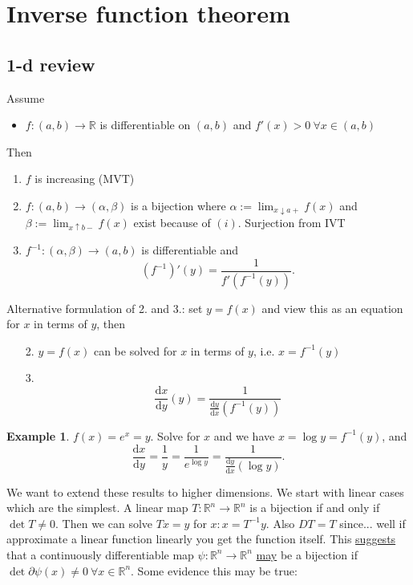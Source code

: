 \documentclass[a4paper]{article}
\theoremstyle{definition}
\newtheorem{eg}[defn]{Example}
\begin{document}
\section{Inverse function theorem}
\subsection{1-d review}
Assume
\begin{itemize}
    \item $f:(a,b) \rightarrow \mathbb R$ is differentiable on $(a,b)$ and $f'(x)>0 \ \forall x\in (a,b)$
\end{itemize}
Then
\begin{enumerate}
    \item $f$ is increasing (MVT)
    \item $f:(a,b)\rightarrow (\alpha,\beta)$ is a bijection where $\displaystyle \alpha:=\lim_{x\downarrow a+}f(x)$ and $\displaystyle \beta:=\lim_{x\uparrow b-}f(x)$ exist because of $(i)$. Surjection from IVT
    \item $f^{-1}:(\alpha,\beta)\rightarrow (a,b)$ is differentiable and
    \[
    \left(f^{-1}\right)' (y) = \frac{1}{f'\left(f^{-1}(y)\right)} .
    \]
\end{enumerate}
Alternative formulation of 2. and 3.: set $y=f(x)$ and view this as an equation for $x$ in terms of $y$, then
\begin{enumerate}
    \item[2.] $y=f(x)$ can be solved for $x$ in terms of $y$, i.e. $x=f^{-1}(y)$
    \item[3.] \[
    \frac{\mathrm d x}{\mathrm d y} (y) = \frac{1}{\frac{\mathrm d y}{\mathrm d x} \left(f^{-1}(y)\right)}
    \]
\end{enumerate}
\begin{eg}
$f(x)=e^x=y$. Solve for $x$ and we have $x=\log y = f^{-1}(y)$, and
\[
\frac{\mathrm d x}{\mathrm d y} = \frac{1}{y} = \frac{1}{e^{\log y}} = \frac{1}{\frac{\mathrm d y}{\mathrm d x} (\log y)}.
\]
\end{eg}

We want to extend these results to higher dimensions. We start with linear cases which are the simplest. A linear map $T:\mathbb R^n \rightarrow \mathbb R^n$ is a bijection if and only if $\det T\neq 0$. Then we can solve $Tx=y$ for $x:x=T^{-1}y$. Also $DT=T$ since... well if approximate a linear function linearly you get the function itself. This \underline{suggests} that a continuously differentiable map $\psi:\mathbb R^n \rightarrow \mathbb R^n$ \underline{may} be a bijection if $\det \partial \psi (x) \neq 0 \ \forall x\in \mathbb R^n$. Some evidence this may be true:
\end{document}
